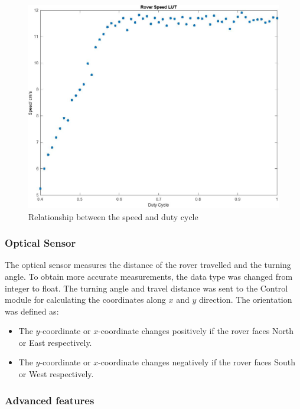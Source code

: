 \documentclass[11pt, a4paper]{article}
\begin{document}
\begin{figure} [h!]
    \centering
    \includegraphics[scale=0.4]{Speed_duty_cycle.jpg}
    \caption{Relationship between the speed and duty cycle}
    \label{fig:duty}
\end{figure}



\subsubsection{Optical Sensor}

The optical sensor measures the distance of the rover travelled and the turning angle. To obtain more accurate measurements, the data type was changed from integer to float. The turning angle and travel distance was sent to the Control module for calculating the coordinates along $x$ and $y$ direction. The orientation was defined as:
\begin{itemize}
    \item The $y$-coordinate or $x$-coordinate changes positively if the rover faces North or East respectively.
    \item The $y$-coordinate or $x$-coordinate changes negatively if the rover faces South or West respectively.
\end{itemize}

\subsubsection{Advanced features}
\end{document}
